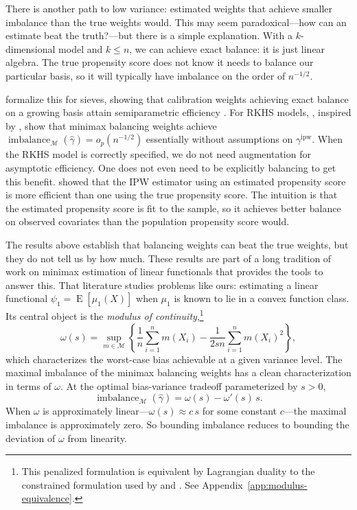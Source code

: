\documentclass{article}
\theoremstyle{definition}
\DeclareMathOperator{\E}{E}
\newcommand{\ipw}{\text{ipw}}
\DeclareMathOperator{\imbalance}{imbalance}
\newcommand{\hgamma}{\ensuremath{\hat\gamma}}
\newcommand{\gammaipw}{\ensuremath{\gamma^{\ipw}}}
\newcommand{\model}{\mathcal{M}}
\newcommand{\<}{\langle}
\renewcommand{\>}{\rangle}
\begin{document}
There is another path to low variance: estimated weights that achieve smaller imbalance than the true weights would. This may seem paradoxical---how can an estimate beat the truth?---but there is a simple explanation. With a $k$-dimensional model and $k \le n$, we can achieve exact balance: it is just linear algebra. The true propensity score does not know it needs to balance our particular basis, so it will typically have imbalance on the order of $n^{-1/2}$.

\citet{chan2016globally} formalize this for sieves, showing that calibration weights achieving exact balance on a growing basis attain semiparametric efficiency \citep[see also][]{fan2016improving, wang2020minimal}. For RKHS models, \citet{hirshberg2019minimax}, inspired by \citet{newey2018cross}, show that minimax balancing weights achieve $\imbalance_{\model}(\hgamma) = o_p(n^{-1/2})$ essentially without assumptions on $\gammaipw$. When the RKHS model is correctly specified, we do not need augmentation for asymptotic efficiency. One does not even need to be explicitly balancing to get this benefit. \citet{hirano2003efficient} showed that the IPW estimator using an estimated propensity score is more efficient than one using the true propensity score. The intuition is that the estimated propensity score is fit to the sample, so it achieves better balance on observed covariates than the population propensity score would.

The results above establish that balancing weights can beat the true weights, but they do not tell us by how much. These results are part of a long tradition of work on minimax estimation of linear functionals \citep{ibragimov1985nonparametric, donoho1991geometrizing, donoho1994statistical, armstrong2018optimal} that provides the tools to answer this. That literature studies problems like ours: estimating a linear functional $\psi_1 = \E[\mu_1(X)]$ when $\mu_1$ is known to lie in a convex function class. Its central object is the \emph{modulus of continuity},\footnote{This penalized formulation is equivalent by Lagrangian duality to the constrained formulation used by \citet{donoho1994statistical} and \citet{armstrong2018optimal}. See Appendix~\ref{app:modulus-equivalence}.}
\begin{equation}
\label{eq:modulus-of-continuity}
\omega(s) = \sup_{m \in \model} \left\{ \frac{1}{n}\sum_{i=1}^n m(X_i) - \frac{1}{2sn} \sum_{i=1}^n m(X_i)^2 \right\},
\end{equation}
which characterizes the worst-case bias achievable at a given variance level. The maximal imbalance of the minimax balancing weights has a clean characterization in terms of $\omega$. At the optimal bias-variance tradeoff parameterized by $s > 0$,
\begin{equation}
\label{eq:donoho-liu-bias}
\imbalance_\model(\hgamma) = \omega(s) - \omega'(s)\,s.
\end{equation}
When $\omega$ is approximately linear---$\omega(s) \approx c\,s$ for some constant $c$---the maximal imbalance is approximately zero. So bounding imbalance reduces to bounding the deviation of $\omega$ from linearity.
\end{document}
